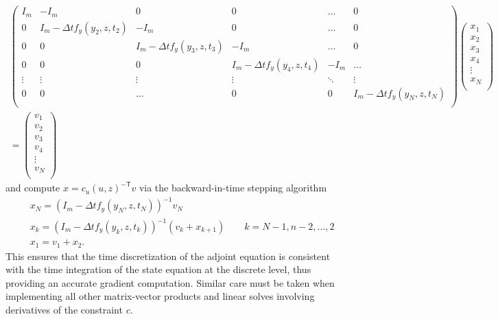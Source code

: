 \documentclass{article}
\newcommand{\invtrp}{^{-\mathsf{T}}}
\begin{document}
\begin{align*}
    \left( \begin{array}{cccccc}
    I_m & -I_m & 0 & 0 & \dots & 0 \\
    0 & I_m-\Delta t f_y(y_2,z,t_2) & -I_m & 0 & \dots & 0 \\
    0 & 0 & I_m - \Delta t f_y(y_3,z,t_3) & -I_m & \dots & 0 \\
    0 & 0 & 0 & I_m - \Delta t f_y(y_4,z,t_4) & -I_m & \dots  \\
    \vdots & \vdots & \vdots & \vdots & \ddots & \vdots \\
    0 & 0  & \dots & 0 & 0 & I_m - \Delta t f_y(y_N,z,t_N) \\
    \end{array} \right)
    \left( \begin{array}{c}
    x_1 \\
    x_2 \\
    x_3 \\
    x_4 \\
    \vdots \\
    x_N \\
    \end{array} \right) \\
    =
    \left( \begin{array}{c}
    v_1 \\
    v_2 \\
    v_3 \\
    v_4 \\
    \vdots \\
    v_N \\
    \end{array} \right)
\end{align*}
and compute $x=c_u(u,z)\invtrp v$ via the backward-in-time stepping algorithm
\begin{align*}
    & x_N = (I_m - \Delta t f_y(y_N,z,t_N))^{-1} v_N \\
    & x_k = (I_m - \Delta t f_y(y_k,z,t_k))^{-1} (v_k + x_{k+1}) \qquad k=N-1,n-2,\dots,2 \\
    & x_1 = v_1 + x_2 .
\end{align*}
This ensures that the time discretization of the adjoint equation is consistent with the time integration of the state equation at the discrete level, thus providing an accurate gradient computation. Similar care must be taken when implementing all other matrix-vector products and linear solves involving derivatives of the constraint $c$.
\end{document}
